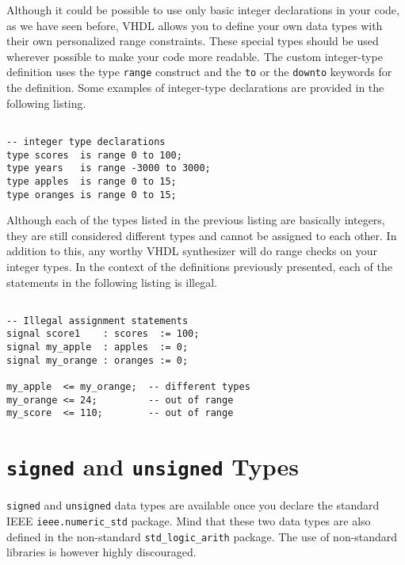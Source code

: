 Although it could be possible to use only basic integer declarations in your code, as we have seen before, VHDL allows you to define your own data types with their own personalized range constraints. These special types should be used wherever possible to make your code more readable. The custom integer-type definition uses the type \texttt{range} construct and the \texttt{to} or the \texttt{downto} keywords for the definition. Some examples of integer-type declarations are provided in the following listing.
\vspace{8pt}

\noindent
\begin{minipage}{0.99\linewidth}
\begin{lstlisting}

-- integer type declarations
type scores  is range 0 to 100; 
type years   is range -3000 to 3000; 
type apples  is range 0 to 15; 
type oranges is range 0 to 15; 
\end{lstlisting}
\end{minipage}

Although each of the types listed in the previous listing are basically integers, they are still considered different types and cannot be assigned to each other. In addition to this, any worthy VHDL synthesizer will do range checks on your integer types. In the context of the definitions previously presented, each of the statements in the following listing is illegal. 
\vspace{8pt}

\noindent
\begin{minipage}{0.99\linewidth}
\begin{lstlisting}

-- Illegal assignment statements
signal score1    : scores  := 100;  
signal my_apple  : apples  := 0; 
signal my_orange : oranges := 0; 

my_apple  <= my_orange;  -- different types
my_orange <= 24;         -- out of range
my_score  <= 110;        -- out of range
\end{lstlisting}
\end{minipage}

\section{\texttt{signed} and \texttt{unsigned} Types}
\texttt{signed} and \texttt{unsigned} data types are available once you declare the standard IEEE \texttt{ieee.numeric\_std} package. Mind that these two data types are also defined in the non-standard \texttt{std\_logic\_arith} package. The use of non-standard libraries is however highly discouraged.


